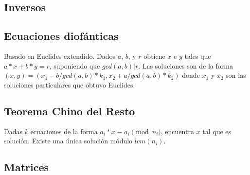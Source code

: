 {\subsection{Inversos}
\subsection{Ecuaciones diofánticas}
Basado en Euclides extendido. Dados $a$, $b$, y $r$ obtiene $x$ e $y$ tales que $a*x + b*y = r$, suponiendo que $gcd(a,b) | r$. Las soluciones son de la forma $(x, y) = (x_1 - b/gcd(a,b) * k_1, x_2 + a/gcd(a,b) * k_2)$ donde $x_1$ y $x_2$ son las soluciones particulares que obtuvo Euclides.
\subsection{Teorema Chino del Resto}
Dadas $k$ ecuaciones de la forma $a_i*x \equiv a_i \pmod {n_i}$, encuentra $x$ tal que es solución. Existe una única solución módulo $lcm(n_i)$.
%
%
%
%

\subsection{Matrices}
}
